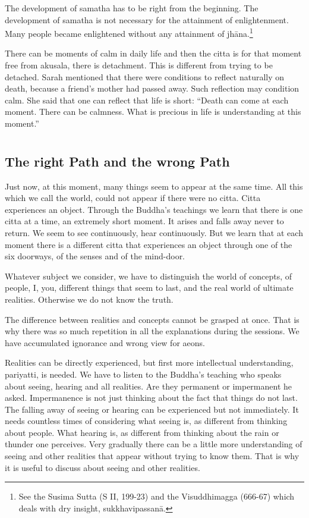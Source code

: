 The development of samatha has to be right from the beginning. The
development of samatha is not necessary for the attainment of
enlightenment. Many people became enlightened without any attainment of
jhāna.\footnote{See the Susima Sutta (S
II, 199-23) and the Visuddhimagga (666-67) which deals with dry insight,
sukkhavipassanā.}

There can be moments of calm in daily life and then the citta is for
that moment free from akusala, there is detachment. This is different
from trying to be detached. Sarah mentioned that there were conditions
to reflect naturally on death, because a friend's mother had passed
away. Such reflection may condition calm. She said that one can reflect
that life is short: ``Death can come at each moment. There can be
calmness. What is precious in life is understanding at this moment.''

\chapter[The right Path and the wrong Path]{}
\section*{The right Path and the wrong Path}



Just now, at this moment, many things seem to appear at the same time.
All this which we call the world, could not appear if there were no
citta. Citta experiences an object. Through the Buddha's teachings we
learn that there is one citta at a time, an extremely short moment. It
arises and falls away never to return. We seem to see continuously, hear
continuously. But we learn that at each moment there is a different
citta that experiences an object through one of the six doorways, of the
senses and of the mind-door.

Whatever subject we consider, we have to distinguish the world of
concepts, of people, I, you, different things that seem to last, and the
real world of ultimate realities. Otherwise we do not know the truth.

The difference between realities and concepts cannot be grasped at once.
That is why there was so much repetition in all the explanations during
the sessions. We have accumulated ignorance and wrong view for aeons.

Realities can be directly experienced, but first more intellectual
understanding, pariyatti, is needed. We have to listen to the Buddha's
teaching who speaks about seeing, hearing and all realities. Are they
permanent or impermanent he asked. Impermanence is not just thinking
about the fact that things do not last. The falling away of seeing or
hearing can be experienced but not immediately. It needs countless times
of considering what seeing is, as different from thinking about people.
What hearing is, as different from thinking about the rain or thunder
one perceives. Very gradually there can be a little more understanding
of seeing and other realities that appear without trying to know them.
That is why it is useful to discuss about seeing and other realities.

